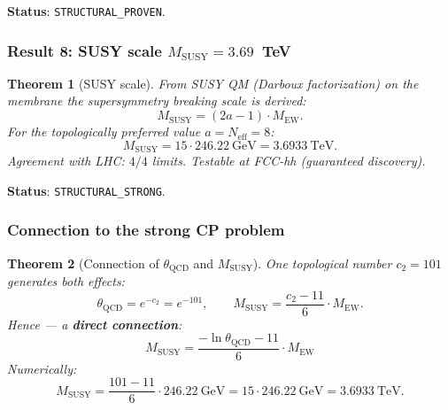 \documentclass[11pt,a4paper]{article}
\newtheorem{theorem}{Theorem}[section]
\theoremstyle{definition}
\begin{document}
\medskip\noindent
\textbf{Status}: \texttt{STRUCTURAL\_PROVEN}.

\subsubsection{Result 8: SUSY scale \texorpdfstring{$M_{\text{SUSY}} = 3.69$}{M\_SUSY = 3.69}~TeV}

\begin{theorem}[SUSY scale]
\label{thm:conclusion-susy}
From SUSY QM (Darboux factorization) on the membrane the
supersymmetry breaking scale is derived:
\begin{equation}
    \boxed{
    M_{\text{SUSY}} = (2a - 1) \cdot M_{\text{EW}}.
    }
    \label{eq:conclusion-MSUSY}
\end{equation}
For the topologically preferred value $a = N_{\text{eff}} = 8$:
\begin{equation}
    \boxed{
    M_{\text{SUSY}} = 15 \cdot 246.22~\text{GeV}
    = 3.6933~\text{TeV}.
    }
    \label{eq:conclusion-MSUSY-value}
\end{equation}
Agreement with LHC: $4/4$ limits.
Testable at FCC-hh (guaranteed discovery).
\end{theorem}

\medskip\noindent
\textbf{Status}: \texttt{STRUCTURAL\_STRONG}.

\subsubsection{Connection to the strong CP problem}

\begin{theorem}[Connection of $\theta_{\text{QCD}}$ and $M_{\text{SUSY}}$]
\label{thm:theta-msusy-link}
One topological number $c_2 = 101$ generates both effects:
\begin{equation}
    \theta_{\text{QCD}} = e^{-c_2} = e^{-101}, \qquad
    M_{\text{SUSY}} = \frac{c_2 - 11}{6} \cdot M_{\text{EW}}.
\end{equation}
Hence --- a \textbf{direct connection}:
\begin{equation}
    \boxed{
    M_{\text{SUSY}} = \frac{-\ln \theta_{\text{QCD}} - 11}{6} \cdot M_{\text{EW}}
    }
    \label{eq:theta-msusy-link}
\end{equation}
Numerically:
\begin{equation}
    M_{\text{SUSY}} = \frac{101 - 11}{6} \cdot 246.22~\text{GeV}
    = 15 \cdot 246.22~\text{GeV}
    = 3.6933~\text{TeV}.
\end{equation}
\end{theorem}
\end{document}
